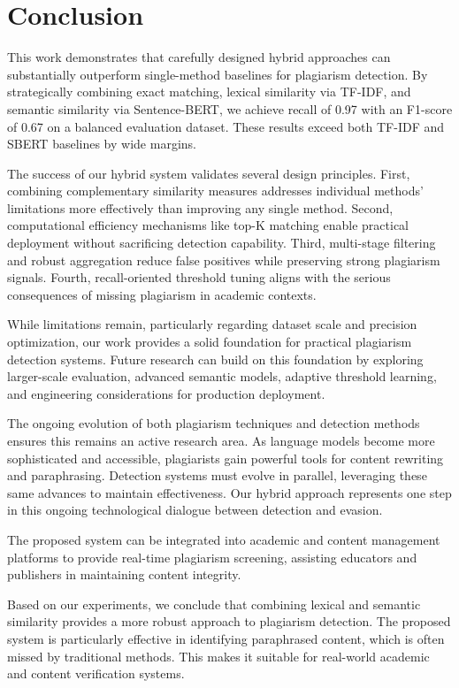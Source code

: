 \documentclass[conference]{IEEEtran}
\begin{document}
\section{Conclusion}

This work demonstrates that carefully designed hybrid approaches can substantially outperform single-method baselines for plagiarism detection. By strategically combining exact matching, lexical similarity via TF-IDF, and semantic similarity via Sentence-BERT, we achieve recall of 0.97 with an F1-score of 0.67 on a balanced evaluation dataset. These results exceed both TF-IDF and SBERT baselines by wide margins.

The success of our hybrid system validates several design principles. First, combining complementary similarity measures addresses individual methods' limitations more effectively than improving any single method. Second, computational efficiency mechanisms like top-K matching enable practical deployment without sacrificing detection capability. Third, multi-stage filtering and robust aggregation reduce false positives while preserving strong plagiarism signals. Fourth, recall-oriented threshold tuning aligns with the serious consequences of missing plagiarism in academic contexts.

While limitations remain, particularly regarding dataset scale and precision optimization, our work provides a solid foundation for practical plagiarism detection systems. Future research can build on this foundation by exploring larger-scale evaluation, advanced semantic models, adaptive threshold learning, and engineering considerations for production deployment.

The ongoing evolution of both plagiarism techniques and detection methods ensures this remains an active research area. As language models become more sophisticated and accessible, plagiarists gain powerful tools for content rewriting and paraphrasing. Detection systems must evolve in parallel, leveraging these same advances to maintain effectiveness. Our hybrid approach represents one step in this ongoing technological dialogue between detection and evasion.

The proposed system can be integrated into academic and content management platforms to provide real-time plagiarism screening, assisting educators and publishers in maintaining content integrity.

Based on our experiments, we conclude that combining lexical and semantic similarity provides a more robust approach to plagiarism detection. The proposed system is particularly effective in identifying paraphrased content, which is often missed by traditional methods. This makes it suitable for real-world academic and content verification systems.
\end{document}

